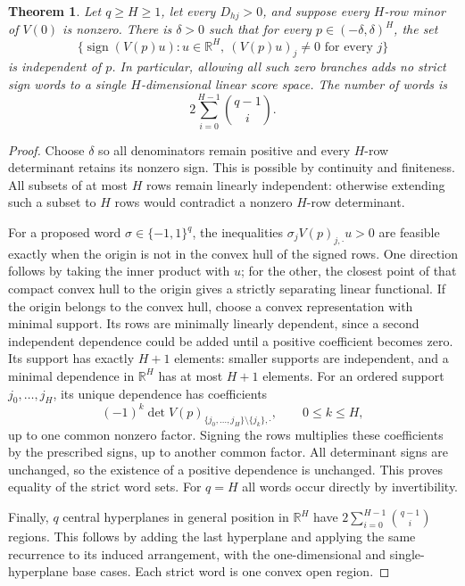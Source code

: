 \documentclass[11pt]{article}
\newtheorem{theorem}{Theorem}
\begin{document}
\begin{theorem}
Let $q\geq H\geq1$, let every $D_{hj}>0$, and suppose every
$H$-row minor of $V(0)$ is nonzero. There is $\delta>0$ such that
for every $p\in(-\delta,\delta)^H$, the set
\[
 \{\operatorname{sign}(V(p)u):u\in\mathbb R^H,
                  \ (V(p)u)_j\ne0\text{ for every }j\}
\]
is independent of $p$. In particular, allowing all such zero branches
adds no strict sign words to a single $H$-dimensional linear score space.
The number of words is
\[
 2\sum_{i=0}^{H-1}\binom{q-1}{i}.
\]
\end{theorem}
\begin{proof}
Choose $\delta$ so all denominators remain positive and every
$H$-row determinant retains its nonzero sign. This is possible by
continuity and finiteness. All subsets of at most $H$ rows remain
linearly independent: otherwise extending such a subset to $H$ rows
would contradict a nonzero $H$-row determinant.

For a proposed word $\sigma\in\{-1,1\}^q$, the inequalities
$\sigma_jV(p)_{j,\cdot}u>0$ are feasible exactly when the origin is
not in the convex hull of the signed rows. One direction follows by
taking the inner product with $u$; for the other, the closest point
of that compact convex hull to the origin gives a strictly separating
linear functional. If the origin belongs to the convex hull, choose
a convex representation with minimal support. Its rows are minimally
linearly dependent, since a second independent dependence could be
added until a positive coefficient becomes zero. Its support has
exactly $H+1$ elements: smaller supports are independent, and a
minimal dependence in $\mathbb R^H$ has at most $H+1$ elements.
For an ordered support $j_0,\ldots,j_H$, its unique dependence has
coefficients
\[
 (-1)^k\det V(p)_{\{j_0,\ldots,j_H\}\setminus\{j_k\},\cdot},
 \qquad 0\leq k\leq H,
\]
up to one common nonzero factor. Signing the rows multiplies these
coefficients by the prescribed signs, up to another common factor.
All determinant signs are unchanged, so the existence of a positive
dependence is unchanged. This proves equality of the strict word sets.
For $q=H$ all words occur directly by invertibility.

Finally, $q$ central hyperplanes in general position in $\mathbb R^H$
have $2\sum_{i=0}^{H-1}\binom{q-1}{i}$ regions. This follows by
adding the last hyperplane and applying the same recurrence to its
induced arrangement, with the one-dimensional and single-hyperplane
base cases. Each strict word is one convex open region.
\end{proof}
\end{document}

